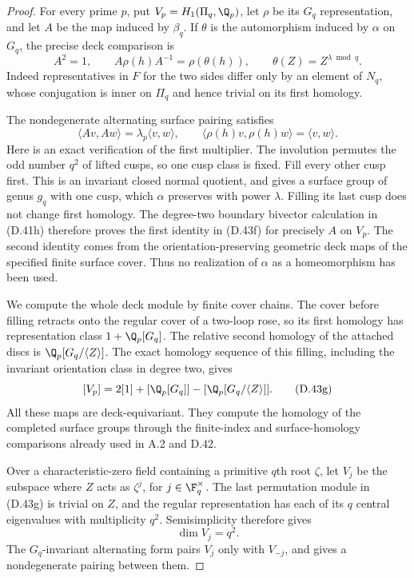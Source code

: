\begin{proof}
For every prime $p$, put $V_p=H_1(\Pi_q,\Q_p)$,
let $\rho$ be its $G_q$ representation, and let
$A$ be the map induced by $\beta_q$.  If $\theta$
is the automorphism induced by $\alpha$ on $G_q$,
the precise deck comparison is
\[
 A^2=1,\qquad
 A\rho(h)A^{-1}=\rho(\theta(h)),\qquad
                    \theta(Z)=Z^{\lambda\bmod q}.
                                                        \tag{D.43e}
\]
Indeed representatives in $F$ for the two sides differ
only by an element of $N_q$, whose conjugation is inner
on $\Pi_q$ and hence trivial on its first homology.

The nondegenerate alternating surface pairing satisfies
\[
 \langle Av,Aw\rangle=\lambda_p\langle v,w\rangle,
       \qquad
 \langle\rho(h)v,\rho(h)w\rangle=\langle v,w\rangle .
                                                        \tag{D.43f}
\]
Here is an exact verification of the first multiplier.
The involution permutes the odd number $q^2$ of lifted
cusps, so one cusp class is fixed.  Fill every other
cusp first.  This is an invariant closed normal
quotient, and gives a surface group of genus $g_q$
with one cusp, which $\alpha$ preserves with power
$\lambda$.  Filling its last cusp does not change
first homology.  The degree-two boundary bivector
calculation in (D.41h) therefore proves the first
identity in (D.43f) for precisely $A$ on $V_p$.
The second identity comes from the orientation-preserving
geometric deck maps of the specified finite surface cover.
Thus no realization of $\alpha$ as a homeomorphism
has been used.

We compute the whole deck module by finite cover chains.
The cover before filling retracts onto the regular
cover of a two-loop rose, so its first homology has
representation class $1+\Q_p[G_q]$.
The relative second homology of the attached discs
is $\Q_p[G_q/\langle Z\rangle]$.
The exact homology sequence of this filling, including
the invariant orientation class in degree two, gives
\[
 [V_p]=
       2[1]+[\Q_p[G_q]]
                 -[\Q_p[G_q/\langle Z\rangle]].
                                                        \tag{D.43g}
\]
All these maps are deck-equivariant.  They compute
the homology of the completed surface groups through
the finite-index and surface-homology comparisons
already used in A.2 and D.42.

Over a characteristic-zero field containing a primitive
$q$th root $\zeta$, let $V_j$ be the subspace where $Z$
acts as $\zeta^j$, for $j\in\F_q^\times$.
The last permutation module in (D.43g) is trivial on
$Z$, and the regular representation has each of its
$q$ central eigenvalues with multiplicity $q^2$.
Semisimplicity therefore gives
\[
                         \dim V_j=q^2 .
                                                        \tag{D.43h}
\]
The $G_q$-invariant alternating form pairs $V_j$
only with $V_{-j}$, and gives a nondegenerate
pairing between them.


\end{proof}
